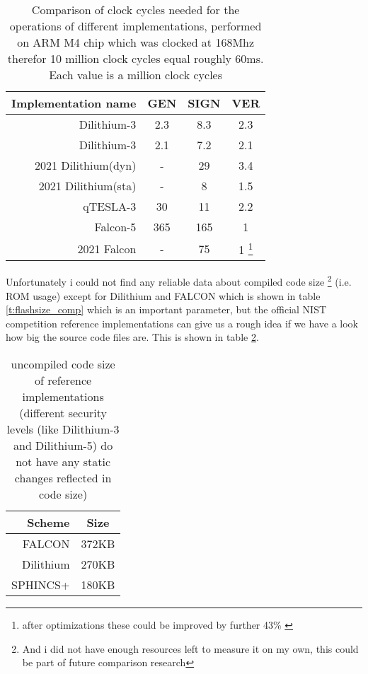 \documentclass[conference]{IEEEtran}
\begin{document}
\begin{table}%
    \caption{Comparison of clock cycles needed for the operations of different implementations, performed on ARM M4 chip which was clocked at 168Mhz therefor 10 million clock cycles equal roughly 60ms. Each value is a million clock cycles}
    \label{t:clockcycles_comp}
    \centering\begin{tabular}{| r | c c c |}
        \hline
        Implementation name                     & GEN           & SIGN         & VER \\
        \hline
        Dilithium-3 \cite{QR_Iot_Lattice}       & 2.3           & 8.3          & 2.3 \\
        Dilithium-3 \cite{Energy_comp}          & 2.1           & 7.2          & 2.1 \\ %
        2021 Dilithium(dyn)\cite{update_sign}   & -             & 29           & 3.4\\
        2021 Dilithium(sta)\cite{update_sign}   & -             & 8            & 1.5\\
        qTESLA-3 \cite{QR_Iot_Lattice}          & 30            & 11           & 2.2\\
        Falcon-5 \cite{QR_Iot_Lattice}          & 365           & 165          & 1\\
        2021 Falcon  \cite{update_sign}         & -             & 75           & 1 \footnote{after optimizations these could be improved by further 43\% \cite{falcon_micro_impl}}\\
        \hline
    \end{tabular}
    
\end{table}


Unfortunately i could not find any reliable data about compiled code size \footnote{And i did not have enough resources left to measure it on my own, this could be part of future comparison research} (i.e. ROM usage) except for Dilithium and FALCON which is shown in table \ref{t:flashsize_comp} which is an important parameter, but the official NIST competition reference implementations \cite{nist_finalists_website} can give us a rough idea if we have a look how big the source code files are. This is shown in table \ref{t:codesize_comp}.

\begin{table}%
    \caption{uncompiled code size of reference implementations (different security levels (like Dilithium-3 and Dilithium-5) do not have any static changes reflected in code size)}
    \label{t:codesize_comp}
    \centering\begin{tabular}{| r | c |}
        \hline
        Scheme & Size\\
        \hline
        FALCON & 372KB \\
        Dilithium & 270KB\\
        SPHINCS+ & 180KB\\

        \hline
    \end{tabular}
\end{table}
\end{document}

